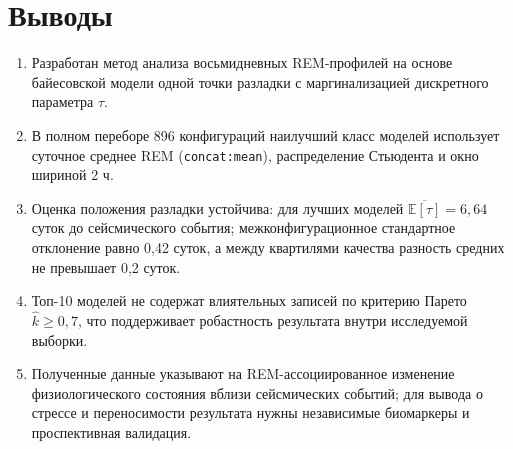 \documentclass[14pt]{mmcs_article}
\begin{document}
\section{Выводы}

\begin{enumerate}
  \item Разработан метод анализа восьмидневных REM-профилей на основе
  байесовской модели одной точки разладки с маргинализацией дискретного
  параметра $\tau$.
  \item В полном переборе 896 конфигураций наилучший класс моделей
  использует суточное среднее REM (\texttt{concat:mean}),
  распределение Стьюдента и окно шириной 2 ч.
  \item Оценка положения разладки устойчива: для лучших моделей
  $\overline{\mathbb E[\tau]}=6{,}64$ суток до сейсмического события;
  межконфигурационное стандартное отклонение равно 0,42 суток, а между
  квартилями качества разность средних не превышает 0,2 суток.
  \item Топ-10 моделей не содержат влиятельных записей по критерию
  Парето $\hat{k}\geq0{,}7$, что поддерживает робастность результата
  внутри исследуемой выборки.
  \item Полученные данные указывают на REM-ассоциированное изменение
  физиологического состояния вблизи сейсмических событий; для вывода о
  стрессе и переносимости результата нужны независимые биомаркеры и
  проспективная валидация.
\end{enumerate}

\renewcommand{\refname}{\centering\textbf{Литература}}


\end{document}
